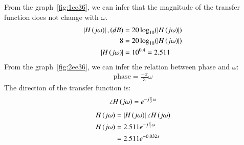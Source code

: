 \documentclass[journal,12pt,twocolumn]{IEEEtran}
\theoremstyle{remark}
\begin{document}
    \solution
    From the graph~\ref{fig:1ee36}, we can infer that the magnitude of the transfer function does not change with $\omega$.
    \begin{align}
        \left\vert{H}\left(j\omega\right)\right\vert, ({dB}) &= 20\log_{10}(\left\vert{H}\left(j\omega\right)\right\vert) \\
        8 &= 20\log_{10}(\left\vert{H}\left(j\omega\right)\right\vert)\\
        \left\vert{H}\left(j\omega\right)\right\vert &= 10^{0.4} = 2.511
    \end{align}
    From the graph~\ref{fig:2ee36}, we can infer the relation between phase and $\omega$:
    \begin{align}
        \text{phase} = \frac{-\pi}{3}\omega
    \end{align}
    The direction of the transfer function is:
    \begin{align}
        \angle H\left(j\omega\right) = e^{-j\frac{\pi}{3}\omega}
    \end{align}
    \begin{align}
        H\left(j\omega\right) &= \left\vert H\left(j\omega\right)\right\vert\angle H\left(j\omega\right)\\
        H\left(j\omega\right) &= 2.511 e^{-j\frac{\pi}{3}\omega} \\
        &= 2.511 e^{-0.032s}
    \end{align}
    \setcounter{figure}{1} %
\end{document}
